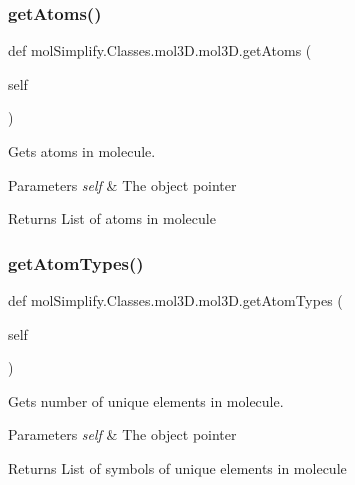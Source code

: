 \subsubsection{\texorpdfstring{get\+Atoms()}{getAtoms()}}
{\footnotesize\ttfamily def mol\+Simplify.\+Classes.\+mol3\+D.\+mol3\+D.\+get\+Atoms (\begin{DoxyParamCaption}\item[{}]{self }\end{DoxyParamCaption})}



Gets atoms in molecule. 


\begin{DoxyParams}{Parameters}
{\em self} & The object pointer \\
\hline
\end{DoxyParams}
\begin{DoxyReturn}{Returns}
List of atoms in molecule 
\end{DoxyReturn}
\mbox{\label{classmolSimplify_1_1Classes_1_1mol3D_1_1mol3D_a53c044279fd5d0dace4f220c950921fa}} 
\subsubsection{\texorpdfstring{get\+Atom\+Types()}{getAtomTypes()}}
{\footnotesize\ttfamily def mol\+Simplify.\+Classes.\+mol3\+D.\+mol3\+D.\+get\+Atom\+Types (\begin{DoxyParamCaption}\item[{}]{self }\end{DoxyParamCaption})}



Gets number of unique elements in molecule. 


\begin{DoxyParams}{Parameters}
{\em self} & The object pointer \\
\hline
\end{DoxyParams}
\begin{DoxyReturn}{Returns}
List of symbols of unique elements in molecule 
\end{DoxyReturn}
\mbox{\label{classmolSimplify_1_1Classes_1_1mol3D_1_1mol3D_aac602cfe9499277393a3d23b55f71db0}} 
